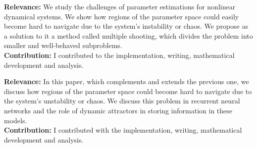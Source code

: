 \documentclass[10pt,letterpaper]{article} %
\begin{document}
    \begin{refsection}
      \nocite{ ribeiro_smoothness_2020 }
      \setlength{\biblabelsep}{-15pt}
      \printbibliography[heading=none]
    \end{refsection}
    \begin{center}
    \begin{minipage}{17cm}
      \begin{footnotesize}
        \textbf{Relevance:}  We study the challenges of parameter estimations for nonlinear dynamical systems. We show how regions of the parameter space could easily become hard to navigate due to the system's instability or chaos. We propose as a solution to it a method called multiple shooting, which divides the problem into smaller and well-behaved subproblems. \\
        \textbf{Contribution: } I contributed to the implementation, writing, mathematical development and analysis.
      \end{footnotesize}
    \end{minipage}
    \end{center}

    \begin{refsection}
      \nocite{ ribeiro_exploding_2020 }
      \setlength{\biblabelsep}{-15pt}
      \printbibliography[heading=none]
    \end{refsection}
    \begin{center}
    \begin{minipage}{17cm}
      \begin{footnotesize}
        \textbf{Relevance:}  In this paper, which complements and extends the previous one, we discuss how regions of the parameter space could become hard to navigate due to the system's unstability or chaos. We discuss this problem in recurrent neural networks and the role of dynamic attractors in storing information in these models. \\
        \textbf{Contribution: } I contributed with the implementation, writing, mathematical development and analysis.
      \end{footnotesize}
    \end{minipage}
    \end{center}
\end{document}
